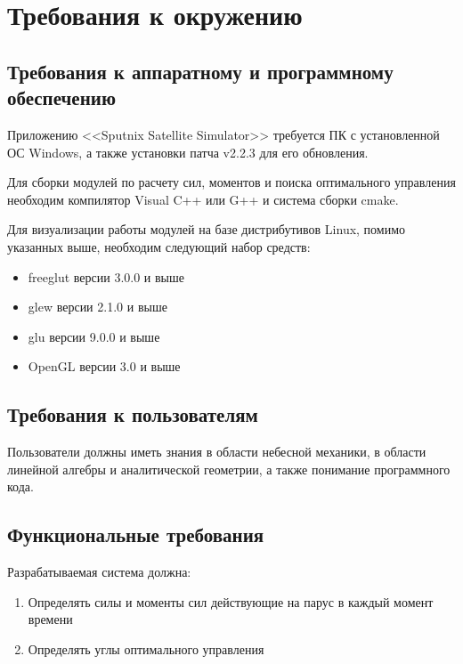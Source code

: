 \chapter{Требования к окружению}
\section{Требования к аппаратному и программному обеспечению}
\noindent\indent Приложению <<Sputnix Satellite Simulator>> требуется ПК с установленной
ОС Windows, а также установки патча v2.2.3 для его обновления.\par
Для сборки модулей по расчету сил, моментов и поиска оптимального
управления необходим компилятор Visual C++ или G++ и система сборки cmake.\par
Для визуализации работы модулей на базе дистрибутивов Linux, помимо
указанных выше, необходим следующий набор средств:
\begin{itemize}
  \item freeglut версии 3.0.0 и выше
  \item glew версии 2.1.0 и выше
  \item glu версии 9.0.0 и выше
  \item OpenGL версии 3.0 и выше
\end{itemize}
\section{Требования к пользователям}
\noindent\indent Пользователи должны иметь знания в области небесной механики,
в области линейной алгебры и аналитической геометрии, а также понимание программного
кода.
\section{Функциональные требования}
\noindent\indent Разрабатываемая система должна:
\begin{enumerate}
  \item Определять силы и моменты сил действующие на парус в каждый момент времени
  \item Определять углы оптимального управления
\end{enumerate}
